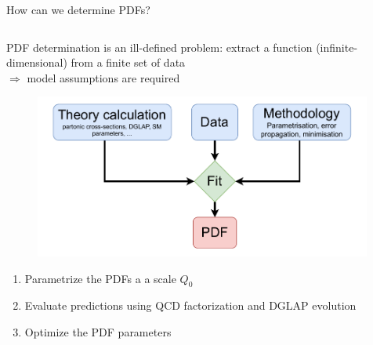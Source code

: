 \documentclass[8pt,t]{beamer}
\begin{document}
\begin{frame}{How can we determine PDFs?}
  \begin{columns}
    \begin{column}{0.5\textwidth}
      PDF determination is an ill-defined problem: extract a function (infinite-dimensional) from a finite set of data \\
      $\Rightarrow$ model assumptions are required

      \begin{figure}
        \includegraphics[width=0.99\textwidth]{pdffitflowchart.pdf}
      \end{figure}

      \vspace*{1em}
      \begin{enumerate}
        \item Parametrize the PDFs a a scale $Q_0$
        \item Evaluate predictions using QCD factorization and DGLAP evolution
        \item Optimize the PDF parameters
      \end{enumerate}


\end{column}
\end{columns}
\end{frame}
\end{document}
